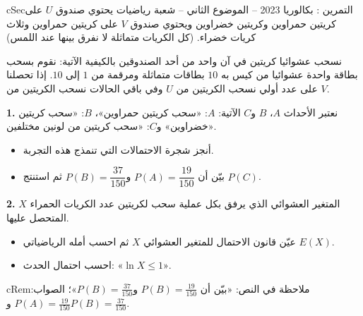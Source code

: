 \documentclass[12pt,a4paper]{article}
\newenvironment{BOX}[2]{\begin{otherlanguage}{english}\begin{arbox}{#1}{#2}}{\end{arbox}\end{otherlanguage}}
\newenvironment{molahada}[1][ملاحظة]{\begin{BOX}{cRem}{#1}}{\end{BOX}}
\newcounter{exo}
\newenvironment{tamrin}[1]{\stepcounter{exo}\begin{BOX}{cSec}{التمرين \theexo: #1}}{\end{BOX}}
\newenvironment{sq}{\begin{itemize}[leftmargin=2.4em,itemsep=3pt]}{\end{itemize}}
\newcommand{\qa}{\item[(أ)]}\newcommand{\qb}{\item[(ب)]}\newcommand{\qc}{\item[(جـ)]}\newcommand{\qd}{\item[(د)]}\newcommand{\qe}{\item[(هـ)]}
\newcommand{\QQ}[1]{\par\smallskip\textbf{#1.} }
\begin{document}
\begin{tamrin}{بكالوريا 2023 -- الموضوع الثاني -- شعبة رياضيات}
يحتوي صندوق $U$ على كريتين حمراوين وكريتين خضراوين ويحتوي صندوق $V$ على كريتين حمراوين وثلاث كريات خضراء. (كل الكريات متماثلة لا نفرق بينها عند اللمس)

نسحب عشوائيا كريتين في آن واحد من أحد الصندوقين بالكيفية الآتية:
نقوم بسحب بطاقة واحدة عشوائيا من كيس به $10$ بطاقات متماثلة ومرقمة من $1$ إلى $10$.
إذا تحصلنا على عدد أولي نسحب الكريتين من $U$ وفي باقي الحالات نسحب الكريتين من $V$.

\QQ{1} نعتبر الأحداث $A$، $B$ و$C$ الآتية: $A$: «سحب كريتين حمراوين»، $B$: «سحب كريتين خضراوين» و$C$: «سحب كريتين من لونين مختلفين».
\begin{sq}
\qa أنجز شجرة الاحتمالات التي تنمذج هذه التجربة.
\qb بيّن أن $P(A)=\dfrac{19}{150}$ و$P(B)=\dfrac{37}{150}$ ثم استنتج $P(C)$.
\end{sq}
\QQ{2} $X$ المتغير العشوائي الذي يرفق بكل عملية سحب لكريتين عدد الكريات الحمراء المتحصل عليها.
\begin{sq}
\qa عيّن قانون الاحتمال للمتغير العشوائي $X$ ثم احسب أمله الرياضياتي $E(X)$.
\qb احسب احتمال الحدث: «$\ln X\leqslant 1$».
\end{sq}
\end{tamrin}
\begin{molahada}
في النص: «بيّن أن $P(B)=\frac{19}{150}$ و$P(B)=\frac{37}{150}$»؛ الصواب: $P(A)=\frac{19}{150}$ و$P(B)=\frac{37}{150}$.
\end{molahada}
\end{document}
